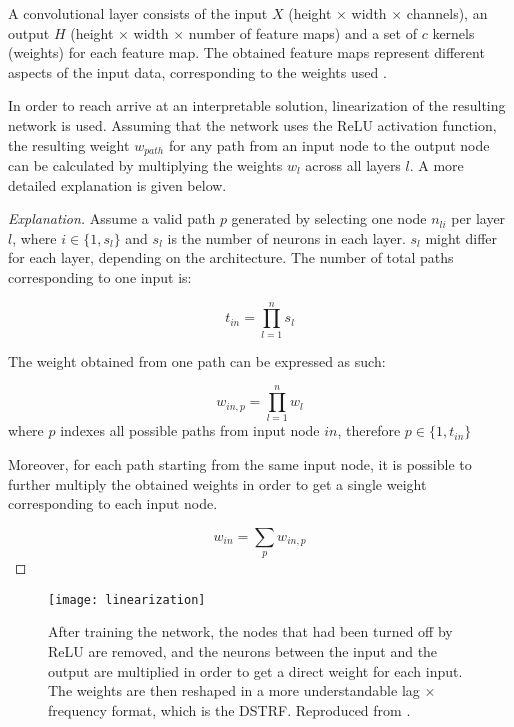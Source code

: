 A convolutional layer consists of the input $X$ (height $\times$ width $\times$ channels), an output $H$ (height $\times$ width $\times$ number of feature maps) and a  set of $c$ kernels (weights) for each feature map. The obtained feature maps represent different aspects of the input data, corresponding to the weights used \parencite{liSurveyConvolutionalNeural2022}.


In order to reach arrive at an interpretable solution, linearization of the resulting network is used. Assuming that the network uses the ReLU activation function, the resulting weight $w_{path}$ for any path from an input node to the output node can be calculated by multiplying the weights $w_l$ across all layers $l$. A more detailed explanation is given below.

\begin{proof}[Explanation]
Assume a valid path $p$ generated by selecting one node $n_{li}$ per layer $l$, where $i \in \{1, s_l\}$ and $s_l$ is the number of neurons in each layer. $s_l$ might differ for each layer, depending on the architecture. The number of total paths corresponding to one input is:

\begin{equation*}
	t_{in} = \prod_{l=1}^n s_l
\end{equation*} 

The weight obtained from one path can be expressed as such:

\begin{equation*}
	w_{in, p} = \prod_{l=1}^{n} w_{l}
\end{equation*}
\noindent where $p$ indexes all possible paths from input node $in$, therefore $p \in \{1, t_{in}\}$

Moreover, for each path starting from the same input node, it is possible to further multiply the obtained weights in order to get a single weight corresponding to each input node.

\begin{equation}
	w_{in} = \sum_p w_{in, p}
\end{equation}

\end{proof}

\begin{figure}[ht]
	\centering
	\texttt{[image: linearization]}
	\caption{After training the network, the nodes that had been turned off by ReLU are removed, and the neurons between the input and the output are multiplied in order to get a direct weight for each input. The weights are then reshaped in a more understandable lag $\times$ frequency format, which is the DSTRF. Reproduced from  \textcite{keshishianEstimatingInterpretingNonlinear2020}.}
\end{figure}

